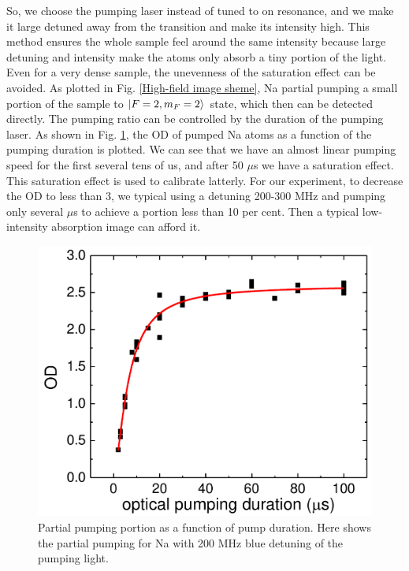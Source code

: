 So, we choose the pumping laser instead of tuned to on resonance, and we make it large detuned away from the transition and make its intensity high. This method ensures the whole sample feel around the same intensity because large detuning and intensity make the atoms only absorb a tiny portion of the light. Even for a very dense sample, the unevenness of the saturation effect can be avoided. As plotted in Fig. \ref{High-field image sheme}, Na partial pumping a small portion of the sample to $\ket{F=2,m_F=2}$ state, which then can be detected directly. The pumping ratio can be controlled by the duration of the pumping laser. As shown in Fig. \ref{partial pumping}, the OD of pumped Na atoms as a function of the pumping duration is plotted. We can see that we have an almost linear pumping speed for the first several tens of us, and after 50 $\mu$s we have a saturation effect. This saturation effect is used to calibrate latterly. For our experiment, to decrease the OD to less than 3, we typical using a detuning 200-300 MHz and pumping only several $\mu$s to achieve a portion less than 10 per cent. Then a typical low-intensity absorption image can afford it.

\begin{figure}[htb]
\begin{center}
\includegraphics[width = 0.8\linewidth]{figures/partial_pumping.pdf}
\end{center}
\caption[Partial pumping portion as function of pump duration]{Partial pumping portion as a function of pump duration. Here shows the partial pumping for Na with 200 MHz blue detuning of the pumping light.}
\label{partial pumping}
\end{figure}

